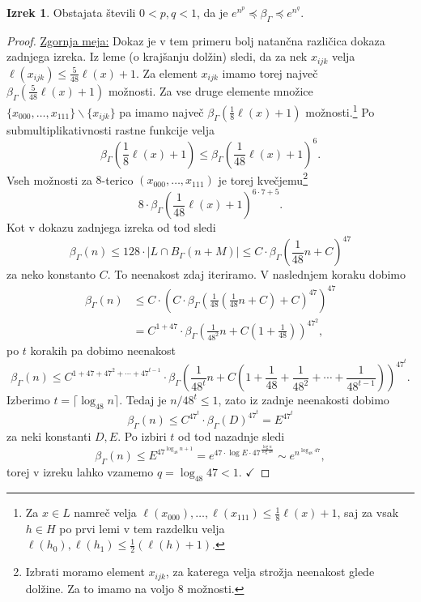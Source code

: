 \documentclass[11pt]{book}
\def\kljuka{$\checkmark$}
\theoremstyle{definition}
\theoremstyle{zgled}
\theoremstyle{odprtproblem}
\theoremstyle{domacanaloga}
\newenvironment{dokaz}
    {\color{siva}\begin{proof}}
    {\end{proof}}
\theoremstyle{izrek}
\newtheorem*{izrek}{Izrek}
\begin{document}
\begin{izrek}
Obstajata števili $0 < p, q < 1$, da je $e^{n^p} \preceq \beta_\Gamma \preceq e^{n^q}$.
\end{izrek}

\begin{dokaz}
\underline{Zgornja meja:}
Dokaz je v tem primeru bolj natančna različica dokaza zadnjega izreka.
Iz leme {\sc (o krajšanju dolžin)} sledi, da za nek $x_{ijk}$ velja $\ell(x_{ijk}) \leq \frac{5}{48} \ell(x) + 1$. Za element $x_{ijk}$ imamo torej največ $\beta_\Gamma(\frac{5}{48} \ell(x) + 1)$ možnosti. Za vse druge elemente množice $\{ x_{000}, \dots, x_{111} \} \backslash \{ x_{ijk} \}$ pa imamo največ $\beta_\Gamma(\frac18 \ell(x) + 1)$ možnosti.\footnote{Za $x \in L$ namreč velja $\ell(x_{000}), \dots, \ell(x_{111}) \leq \frac18 \ell(x) + 1$, saj za vsak $h \in H$ po prvi lemi v tem razdelku velja $\ell(h_0), \ell(h_1) \leq \frac12 (\ell(h) + 1)$.} Po submultiplikativnosti rastne funkcije velja
\[
\beta_\Gamma \left( \frac18 \ell(x) + 1 \right) \leq \beta_\Gamma \left( \frac{1}{48} \ell(x) + 1 \right)^6.
\]
Vseh možnosti za $8$-terico $(x_{000}, \dots, x_{111})$ je torej kvečjemu\footnote{Izbrati moramo element $x_{ijk}$, za katerega velja strožja neenakost glede dolžine. Za to imamo na voljo $8$ možnosti.}
\[
8 \cdot \beta_\Gamma \left( \frac{1}{48} \ell(x) + 1 \right)^{6 \cdot 7 + 5}.
\]
Kot v dokazu zadnjega izreka od tod sledi
\[
\beta_\Gamma(n) \leq 128 \cdot |L \cap B_\Gamma(n+M)| \leq C \cdot \beta_\Gamma\left(\frac{1}{48} n + C\right)^{47}
\]
za neko konstanto $C$. To neenakost zdaj iteriramo. V naslednjem koraku dobimo
\begin{align*}
\beta_\Gamma(n) &\leq C \cdot \left( C \cdot \beta_\Gamma\left(\frac{1}{48} \left( \frac{1}{48} n + C \right) + C\right)^{47}\right)^{47} \\
&= C^{1 + 47} \cdot \beta_\Gamma \left( \frac{1}{48^2} n + C \left(1 + \frac{1}{48}\right) \right)^{47^2},
\end{align*}
po $t$ korakih pa dobimo neenakost
\[
\beta_\Gamma(n) \leq C^{1 + 47 + 47^2 + \cdots + 47^{t-1}} \cdot \beta_\Gamma \left( \frac{1}{48^t} n + C \left( 1 + \frac{1}{48} + \frac{1}{48^2} + \cdots + \frac{1}{48^{t-1}} \right) \right)^{47^t}.
\]
Izberimo $t = \lceil \log_{48} n \rceil$. Tedaj je $n/48^t \leq 1$, zato iz zadnje neenakosti dobimo
\[
\beta_\Gamma(n) \leq C^{47^t} \cdot \beta_\Gamma(D)^{47^t} = E^{47^t}
\]
za neki konstanti $D, E$. Po izbiri $t$ od tod nazadnje sledi
\[
\beta_\Gamma(n) \leq E^{47^{\log_{48} n + 1}} 
= e^{47 \cdot \log E \cdot 47^{\frac{\log n}{\log 48}}}
\sim e^{n^{\log_{48} 47}},
\]
torej v izreku lahko vzamemo $q = \log_{48} 47 < 1$. \kljuka


\end{dokaz}
\end{document}
